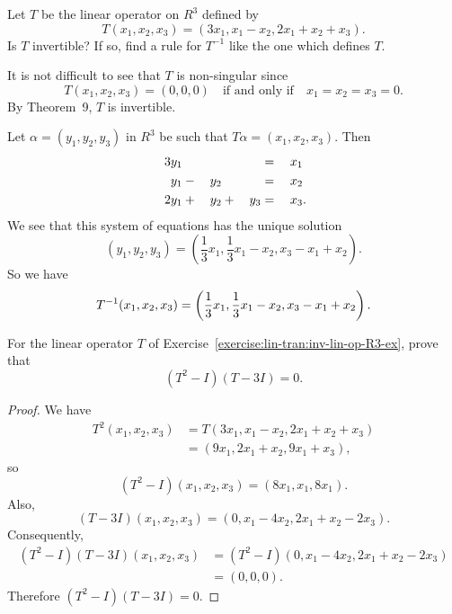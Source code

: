 \label{exercise:lin-tran:inv-lin-op-R3-ex}
Let $T$ be the linear operator on $R^3$ defined by
\begin{equation*}
  T(x_1,x_2,x_3) = (3x_1, x_1 - x_2, 2x_1 + x_2 + x_3).
\end{equation*}
Is $T$ invertible? If so, find a rule for $T^{-1}$ like the one which
defines $T$.
\begin{solution}
  It is not difficult to see that $T$ is non-singular since
  \begin{equation*}
    T(x_1,x_2,x_3) = (0,0,0)
    \quad\text{if and only if}\quad
    x_1 = x_2 = x_3 = 0.
  \end{equation*}
  By Theorem~9, $T$ is invertible.

  Let $\alpha = (y_1,y_2,y_3)$ in $R^3$ be such that
  $T\alpha = (x_1,x_2,x_3)$. Then
  \begin{alignat*}{4}
    3y_1 && && &{}={}& x_1 \\
    y_1 &{}-{}& y_2 && &{}={}& x_2 \\
    2y_1 &{}+{}& y_2 &{}+{}& y_3 &{}={}& x_3\rlap.
  \end{alignat*}
  We see that this system of equations has the unique solution
  \begin{equation*}
    (y_1,y_2,y_3)
    = \left(\frac13x_1, \frac13x_1 - x_2, x_3 - x_1 + x_2\right).
  \end{equation*}
  So we have
  \begin{equation*}
    T^{-1}(x_1,x_2,x_3)
    = \left(\frac13x_1, \frac13x_1 - x_2, x_3 - x_1 + x_2\right).
    \qedhere
  \end{equation*}
\end{solution}

 For the linear operator $T$ of
Exercise~\ref{exercise:lin-tran:inv-lin-op-R3-ex}, prove that
\begin{equation*}
  (T^2 - I)(T - 3I) = 0.
\end{equation*}
\begin{proof}
  We have
  \begin{align*}
    T^2(x_1,x_2,x_3)
    &= T(3x_1, x_1 - x_2, 2x_1 + x_2 + x_3) \\
    &= (9x_1, 2x_1 + x_2, 9x_1 + x_3),
  \end{align*}
  so
  \begin{equation*}
    (T^2 - I)(x_1,x_2,x_3)
    = (8x_1, x_1, 8x_1).
  \end{equation*}
  Also,
  \begin{equation*}
    (T - 3I)(x_1, x_2, x_3)
    = (0, x_1 - 4x_2, 2x_1 + x_2 - 2x_3).
  \end{equation*}
  Consequently,
  \begin{align*}
    (T^2 - I)(T - 3I)(x_1,x_2,x_3)
    &= (T^2 - I)(0, x_1 - 4x_2, 2x_1 + x_2 - 2x_3) \\
    &= (0, 0, 0).
  \end{align*}
  Therefore $(T^2 - I)(T - 3I) = 0$.
\end{proof}

